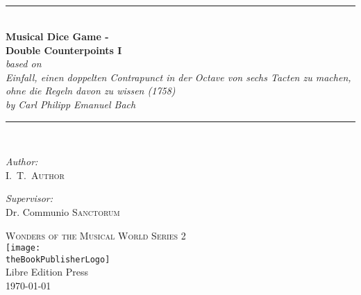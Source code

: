 \documentclass[a4paper,x11names,svgnames,10pt]{article}
\title{\textsc{\mdgBookTitle}}
\author{\textsc{\authorFirstMidNameInit \authorLastName}}
\date{\textsc{\dateGenerated}}
\def\authorFirstMidNameInit{I.\ T.\ }
\def\authorLastName{Author}
\def\dateGenerated{\today}
\def\volNumber{I}
\def\mdgBookTitle{Musical Dice Game - \\[0.15cm] Double Counterpoints \volNumber}
\def\mdgBookSubTitle{{\small based on}\\ Einfall, einen doppelten Contrapunct in der Octave von sechs Tacten zu machen, ohne die Regeln davon zu wissen (1758) \\[0.15cm] by Carl Philipp Emanuel Bach}
\def\theBookSeries{Wonders of the Musical World Series 2}
\def\theBookPublisher{Libre Edition Press}
\def\theBookPublisherLogo{../images/1ed.png}
\newcommand{\HRule}{\rule{\linewidth}{0.5mm}}
\begin{document}


\newpage
{
${}_{}$\\
\vspace{1.00in}	
\thispagestyle{empty}
\begin{center}
	\HRule \\[0.4cm]
	{\huge \bfseries \mdgBookTitle} \\[0.2cm]
	{\large{\em \mdgBookSubTitle} }\\[0.2cm]
	\HRule \\[1.5cm]
	\begin{minipage}{0.4\textwidth}
		\begin{flushleft} \large
			\emph{Author:}\\
			\authorFirstMidNameInit \textsc{\authorLastName}
		\end{flushleft}
	\end{minipage}
	\begin{minipage}{0.4\textwidth}
		\begin{flushright} \large
			\emph{Supervisor:} \\
			Dr. Communio \textsc{Sanctorum}
		\end{flushright}
	\end{minipage}
	\vfill
	{\textsc{\Large \theBookSeries}}  \\[0.2cm] 
	\texttt{[image: \\theBookPublisherLogo]}\\ 
	{\large \theBookPublisher \\
       \dateGenerated }\\
	\vspace{2.50in}
\end{center}
\newpage


\tableofcontents\label{tabofcon}


\baselineskip 14pt

\newpage
}
\end{document}
